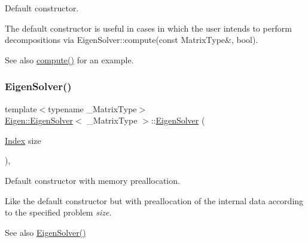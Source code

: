 Default constructor. 

The default constructor is useful in cases in which the user intends to perform decompositions via Eigen\+Solver\+::compute(const Matrix\+Type\&, bool).

\begin{DoxySeeAlso}{See also}
\mbox{\hyperlink{class_eigen_1_1_eigen_solver_a38d032b75b3e75640e3db42e7ab20c24}{compute()}} for an example. 
\end{DoxySeeAlso}
\mbox{\label{class_eigen_1_1_eigen_solver_aa4edf56ecc178b277b75c13a2ca1089f}} 
\subsubsection{\texorpdfstring{EigenSolver()}{EigenSolver()}\hspace{0.1cm}{\footnotesize\ttfamily [2/3]}}
{\footnotesize\ttfamily template$<$typename \+\_\+\+Matrix\+Type$>$ \\
\mbox{\hyperlink{class_eigen_1_1_eigen_solver}{Eigen\+::\+Eigen\+Solver}}$<$ \+\_\+\+Matrix\+Type $>$\+::\mbox{\hyperlink{class_eigen_1_1_eigen_solver}{Eigen\+Solver}} (\begin{DoxyParamCaption}\item[{\mbox{\hyperlink{class_eigen_1_1_eigen_solver_a5bff6a6bc0efac67d52c60c2c3deb9ee}{Index}}}]{size }\end{DoxyParamCaption})\hspace{0.3cm}{\ttfamily [inline]}, {\ttfamily [explicit]}}



Default constructor with memory preallocation. 

Like the default constructor but with preallocation of the internal data according to the specified problem {\itshape size}. \begin{DoxySeeAlso}{See also}
\mbox{\hyperlink{class_eigen_1_1_eigen_solver_a3af22d721a6401365881b2ef252d26aa}{Eigen\+Solver()}} 
\end{DoxySeeAlso}
\mbox{\label{class_eigen_1_1_eigen_solver_a7e8ab3d89ea525af5f27f1a8e805fae1}} 
